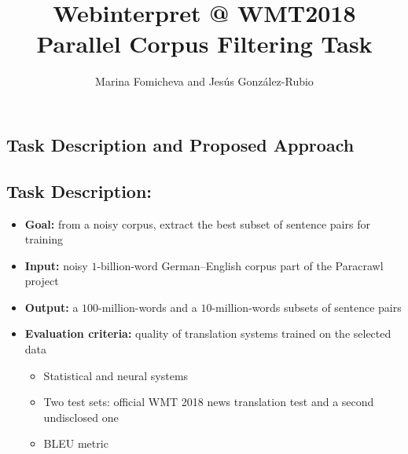 \documentclass[a0]{sciposter}
\title{Webinterpret @ WMT2018\\Parallel Corpus Filtering Task}
\author{Marina Fomicheva and Jes\'{u}s Gonz\'{a}lez-Rubio}
\institute{AT Language Solutions$^*$ and Webinterpret\\\vspace*{-.45em}{\footnotesize $^*$Marina Fomicheva worked at Webinterpret at the time of preparation of this submission.}}
\begin{document}
\maketitle

\begin{multicols*}{2}



\section*{\Large Task Description and Proposed Approach}

\subsection*{Task Description:}
\begin{itemize}
  \item {\bf Goal:} from a noisy corpus, extract the best subset of sentence pairs for training
  \item {\bf Input:} noisy $1$-billion-word German--English corpus part of the Paracrawl project %
  \item {\bf Output:} a $100$-million-words and a $10$-million-words subsets of sentence pairs
  \item {\bf Evaluation criteria:} quality of translation systems trained on the selected data
  \begin{itemize}
    \item Statistical and neural systems
    \item Two test sets: official WMT 2018 news translation test and a second undisclosed one
    \item BLEU metric
  \end{itemize}
\end{itemize}


\end{multicols*}
\end{document}
